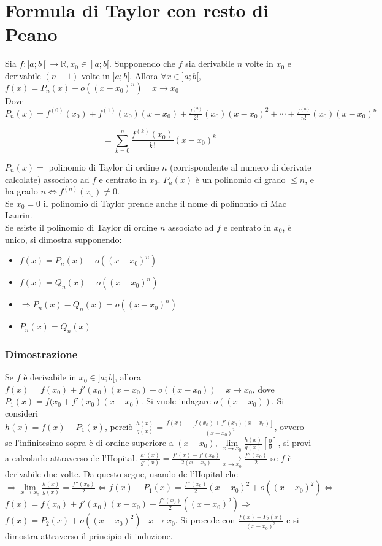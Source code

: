 \section{Formula di Taylor con resto di Peano}
Sia $f:]a;b[\rightarrow\mathbb{R}, x_0\in]a;b[$. Supponendo che $f$ sia derivabile $n$ volte in $x_0$ e derivabile $(n-1)$ volte in $]a;b[$. Allora $\forall x\in ]a;b[$,\\
$f(x)=P_n(x)+o((x-x_0)^n)\;\;\;\;x\rightarrow x_0$\\
Dove $P_n(x)=f^{(0)}(x_0)+f^{(1)}(x_0)(x-x_0)+\frac{f^{(2)}}{2!}(x_0)(x-x_0)^2+\cdots+\frac{f^{(n)}}{n!}(x_0)(x-x_0)^n$
\begin{center}
\begin{equation}
=\sum\limits_{k=0}^n\dfrac{f^{(k)}(x_0)}{k!}(x-x_0)^k
\end{equation}
\end{center}
$P_n(x)=$ polinomio di Taylor di ordine $n$ (corrispondente al numero di derivate calcolate) associato ad $f$ e centrato in $x_0$. $P_n(x)$ \`e un polinomio di grado $\le n$, e 
ha grado $n\Leftrightarrow f^{(n)}(x_0)\neq 0$.\\
Se $x_0=0$ il polinomio di Taylor prende anche il nome di polinomio di Mac Laurin.\\
Se esiste il polinomio di Taylor di ordine $n$ associato ad $f$ e centrato in $x_0$, \`e unico, si dimostra supponendo:
\begin{itemize}
\item $f(x)=P_n(x)+o((x-x_0)^n)$
\item $f(x)=Q_n(x)+o((x-x_0)^n)$
\item $\Rightarrow P_n(x)-Q_n(x)=o((x-x_0)^n)$
\item $P_n(x)=Q_n(x)$
\end{itemize}
\subsubsection{Dimostrazione}
Se $f$ \`e derivabile in $x_0\in ]a;b[$, allora\\
$f(x)=f(x_0)+f'(x_0)(x-x_0)+o((x-x_0))\;\;\;\;x\rightarrow x_0$, dove\\
$P_1(x)=f(x_0+f'(x_0)(x-x_0)$. Si vuole indagare $o((x-x_0))$. Si consideri\\
$h(x)=f(x)-P_1(x)$, perci\`o $\frac{h(x)}{g(x)}=\frac{f(x)-[f(x_0)+f'(x_0)(x-x_0)]}{(x-x_0)^2}$, ovvero se l'infinitesimo sopra \`e di ordine superiore a $(x-x_0)$, $\lim\limits_{x\rightarrow x_0}\frac{h(x)}{g(x)}[\frac{0}{0}]$, si provi a calcolarlo attraverso de l'Hopital. $\frac{h'(x)}{g'(x)}=\frac{f'(x)-f'(x_0)}{2(x-x_0)}\xrightarrow[x\rightarrow x_0]{}\frac{f''(x_0)}{2}$ se $f$ \`e derivabile due volte. Da questo segue, usando de l'Hopital che $\Rightarrow \lim\limits_{x\rightarrow x_0}\frac{h(x)}{g(x)}=\frac{f''(x_0)}{2}\Leftrightarrow f(x)-P_1(x)=\frac{f''(x_0)}{2}(x-x_0)^2+o((x-x_0)^2)\Leftrightarrow$\\
$f(x)=f(x_0)+f'(x_0)(x-x_0)+\frac{f''(x_0)}{2}((x-x_0)^2)\Rightarrow$\\
$f(x)=P_2(x)+o((x-x_0)^2)\;\;\; x\rightarrow x_0$. Si procede con $\frac{f(x)-P_2(x)}{(x-x_0)^3}$ e si dimostra attraverso il principio di induzione.
